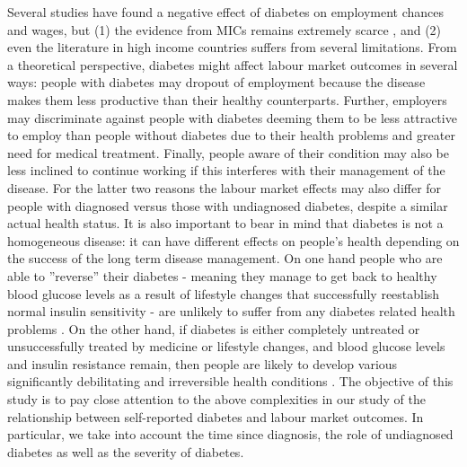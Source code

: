 Several studies have found a negative effect of diabetes on employment
chances and wages, but (1) the evidence from \ac{MICs} remains
extremely scarce \citep{Seuring2015a}, and (2) even the literature
in high income countries suffers from several limitations. From a
theoretical perspective, diabetes might affect labour market outcomes
in several ways:
people with diabetes may dropout
of employment because the disease makes them less productive than
their healthy counterparts. Further, employers may discriminate against
people with diabetes deeming them to be less attractive to employ
than people without diabetes due to their health problems and greater
need for medical treatment. Finally, people aware of their condition
may also be less inclined to continue working if this interferes with
their management of the disease. For the latter two reasons the labour
market effects may also differ for people with diagnosed versus those
with undiagnosed diabetes, despite a similar actual health status.
It is also important to bear in mind that diabetes is not a homogeneous
disease: it can have different effects on people's health depending
on the success of the long term disease management. On one hand people
who are able to ''reverse'' their diabetes - meaning they manage
to get back to healthy blood glucose levels as a result of lifestyle
changes that successfully reestablish normal insulin sensitivity -
are unlikely to suffer from any diabetes related health problems \citep{Lim2011,Gregg2012}.
On the other hand, if diabetes is either completely untreated or unsuccessfully
treated by medicine or lifestyle changes, and blood glucose levels
and insulin resistance remain, then people are likely to develop various
significantly debilitating and irreversible health conditions \citep{Reynoso-Noveron2011}.
The objective of this study is to pay close attention to the above
complexities in our study of the relationship between
self-reported diabetes and labour market outcomes. In particular,
we take into account the time since diagnosis, the role of undiagnosed
diabetes as well as the severity of diabetes. %
